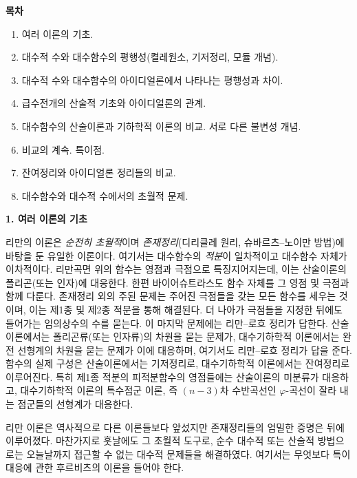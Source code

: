 \begin{center}
\textbf{목차}
\end{center}
\begin{enumerate}
\item 여러 이론의 기초.
\item 대수적 수와 대수함수의 평행성(켤레원소, 기저정리, 모듈 개념).
\item 대수적 수와 대수함수의 아이디얼론에서 나타나는 평행성과 차이.
\item 급수전개의 산술적 기초와 아이디얼론의 관계.
\item 대수함수의 산술이론과 기하학적 이론의 비교. 서로 다른 불변성 개념.
\item 비교의 계속. 특이점.
\item 잔여정리와 아이디얼론 정리들의 비교.
\item 대수함수와 대수적 수에서의 초월적 문제.
\end{enumerate}

\begin{center}
\textbf{1. 여러 이론의 기초}
\end{center}

리만의 이론은 \emph{순전히 초월적}이며 \emph{존재정리}(디리클레 원리, 슈바르츠--노이만 방법)에 바탕을 둔 유일한 이론이다. 여기서는 대수함수의 \emph{적분}이 일차적이고 대수함수 자체가 이차적이다. 리만곡면 위의 함수는 영점과 극점으로 특징지어지는데, 이는 산술이론의 폴리곤(또는 인자)에 대응한다. 한편 바이어슈트라스도 함수 자체를 그 영점 및 극점과 함께 다룬다. 존재정리 외의 주된 문제는 주어진 극점들을 갖는 모든 함수를 세우는 것이며, 이는 제1종 및 제2종 적분을 통해 해결된다. 더 나아가 극점들을 지정한 뒤에도 들어가는 임의상수의 수를 묻는다. 이 마지막 문제에는 리만--로흐 정리가 답한다. 산술이론에서는 폴리곤류(또는 인자류)의 차원을 묻는 문제가, 대수기하학적 이론에서는 완전 선형계의 차원을 묻는 문제가 이에 대응하며, 여기서도 리만--로흐 정리가 답을 준다. 함수의 실제 구성은 산술이론에서는 기저정리로, 대수기하학적 이론에서는 잔여정리로 이루어진다. 특히 제1종 적분의 피적분함수의 영점들에는 산술이론의 미분류가 대응하고, 대수기하학적 이론의 특수점군 이론, 즉 \((n-3)\)차 수반곡선인 \(\varphi\)-곡선이 잘라 내는 점군들의 선형계가 대응한다.

리만 이론은 역사적으로 다른 이론들보다 앞섰지만 존재정리들의 엄밀한 증명은 뒤에 이루어졌다. 마찬가지로 훗날에도 그 초월적 도구로, 순수 대수적 또는 산술적 방법으로는 오늘날까지 접근할 수 없는 대수적 문제들을 해결하였다. 여기서는 무엇보다 특이대응에 관한 후르비츠의 이론을 들어야 한다.

